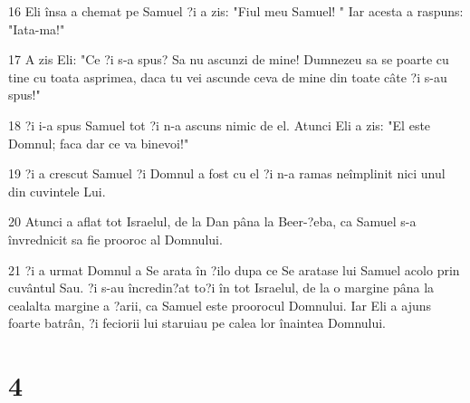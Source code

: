\par 16 Eli însa a chemat pe Samuel ?i a zis: "Fiul meu Samuel! " Iar acesta a raspuns: "Iata-ma!"
\par 17 A zis Eli: "Ce ?i s-a spus? Sa nu ascunzi de mine! Dumnezeu sa se poarte cu tine cu toata asprimea, daca tu vei ascunde ceva de mine din toate câte ?i s-au spus!"
\par 18 ?i i-a spus Samuel tot ?i n-a ascuns nimic de el. Atunci Eli a zis: "El este Domnul; faca dar ce va binevoi!"
\par 19 ?i a crescut Samuel ?i Domnul a fost cu el ?i n-a ramas neîmplinit nici unul din cuvintele Lui.
\par 20 Atunci a aflat tot Israelul, de la Dan pâna la Beer-?eba, ca Samuel s-a învrednicit sa fie prooroc al Domnului.
\par 21 ?i a urmat Domnul a Se arata în ?ilo dupa ce Se aratase lui Samuel acolo prin cuvântul Sau. ?i s-au încredin?at to?i în tot Israelul, de la o margine pâna la cealalta margine a ?arii, ca Samuel este proorocul Domnului. Iar Eli a ajuns foarte batrân, ?i feciorii lui staruiau pe calea lor înaintea Domnului.

\chapter{4}

